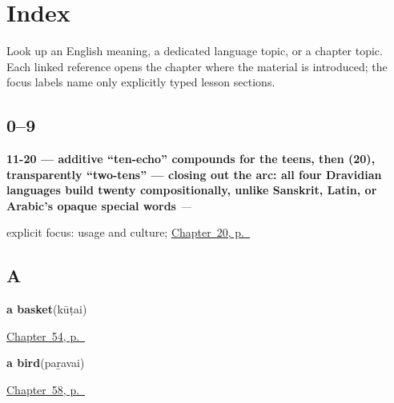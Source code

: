
\chapter*{Index}

Look up an English meaning, a dedicated language topic, or a chapter topic. Each linked reference opens the chapter where the material is introduced; the focus labels name only explicitly typed lesson sections.

\section*{0--9}

\noindent\begin{minipage}[t]{\linewidth}
\raggedright
\textbf{11-20 — additive \textquotedblleft{}ten-echo\textquotedblright{} compounds for the teens, then  (20), transparently \textquotedblleft{}two-tens\textquotedblright{} — closing out the arc: all four Dravidian languages build twenty compositionally, unlike Sanskrit, Latin, or Arabic's opaque special words}\enspace\emph{ — }\par
\footnotesize explicit focus: usage and culture; \hyperref[ch:ta-numbers-and-weather]{Chapter~20, p.~\pageref*{ch:ta-numbers-and-weather}}
\end{minipage}\par\smallskip

\section*{A}

\noindent\begin{minipage}[t]{\linewidth}
\raggedright
\textbf{a basket}\enspace\emph{}\enspace(kūṭai)\par
\footnotesize \hyperref[ch:ta-things-in-the-house]{Chapter~54, p.~\pageref*{ch:ta-things-in-the-house}}
\end{minipage}\par\smallskip

\noindent\begin{minipage}[t]{\linewidth}
\raggedright
\textbf{a bird}\enspace\emph{}\enspace(paṟavai)\par
\footnotesize \hyperref[ch:ta-around-the-yard]{Chapter~58, p.~\pageref*{ch:ta-around-the-yard}}
\end{minipage}\par\smallskip

